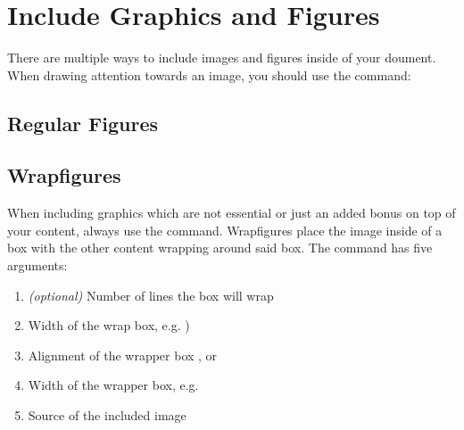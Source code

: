 \documentclass[
    narrow,
    fontstyle=light,
    babelparam=ngerman
]{elite}
\begin{document}


\newpage

\section{Include Graphics and Figures}
\label{sec:include-graphics-and-figures}

There are multiple ways to include images and figures inside of your doument.
When drawing attention towards an image, you should use the  command:

\subsection{Regular Figures}
\label{subsec:regular-figures}


\begin{CodeListing}
\end{CodeListing}

\subsection{Wrapfigures}
\label{subsec:wrapfigures}


When including graphics which are not essential or just an added bonus on top of your content,
always use the  command. Wrapfigures place the image inside of
a box with the other content wrapping around said box. The  command has
five arguments:
\begin{enumerate}
    \item \textit{(optional)} Number of lines the box will wrap
    \item Width of the wrap box, e.g. )
    \item Alignment of the wrapper box ,  or 
    \item Width of the wrapper box, e.g. 
    \item Source of the included image
\end{enumerate}
\end{document}
